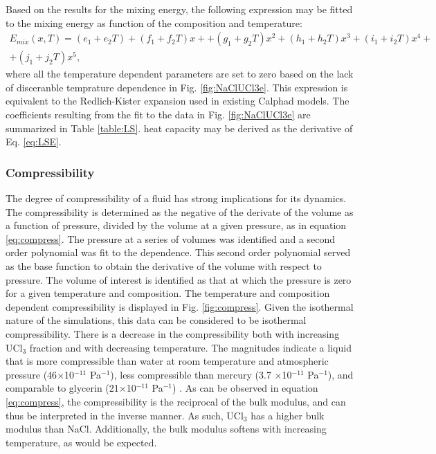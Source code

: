 \documentclass[preprint,3p,10pt,onecolumn,number,sort&compress]{elsarticle}
\begin{document}
Based on the results for the mixing energy, the following expression may be fitted to the mixing energy as function of the composition and temperature:
\begin{equation}
\begin{split}
E_{mix}(x,T)=(e_1+e_2T)+(f_1+f_2T)x++(g_1+g_2T)x^2+(h_1+h_2T)x^3+(i_1+i_2T)x^4+\\
+(j_1+j_2T)x^5,
\label{eq:LSE}
\end{split}
\end{equation}
where all the temperature dependent parameters are set to zero based on the lack of disceranble temprature dependence in Fig. \ref{fig:NaClUCl3e}. This expression is equivalent to the Redlich-Kister expansion used in existing Calphad models. The coefficients resulting from the fit to the data in Fig. \ref{fig:NaClUCl3e} are summarized in Table \ref{table:LS}. heat capacity may be derived as the derivative of Eq. \ref{eq:LSE}.

\subsubsection{Compressibility}

The degree of compressibility of a fluid has strong implications for its dynamics. The compressibility is determined as the negative of the derivate of the volume as a function of pressure, divided by the volume at a given pressure, as in equation \ref{eq:compress}. The pressure at a series of volumes was identified and a second order polynomial was fit to the dependence. This second order polynomial served as the base function to obtain the derivative of the volume with respect to pressure. The volume of interest is identified as that at which the pressure is zero for a given temperature and composition. The temperature and composition dependent compressibility is displayed in Fig. \ref{fig:compress}. Given the isothermal nature of the simulations, this data can be considered to be isothermal compressibility. There is a decrease in the compressibility both with increasing UCl$_3$ fraction and with decreasing temperature. The magnitudes indicate a liquid that is more compressible than water at room temperature and atmospheric pressure (46$\times$10$^{-11}$ Pa$^{-1}$), less compressible than mercury (3.7 $\times$10$^{-11}$ Pa$^{-1}$), and comparable to glycerin (21$\times$10$^{-11}$ Pa$^{-1}$) \cite{aiphandbook}. As can be observed in equation \ref{eq:compress}, the compressibility is the reciprocal of the bulk modulus, and can thus be interpreted in the inverse manner. As such, UCl$_3$ has a higher bulk modulus than NaCl. Additionally, the bulk modulus softens with increasing temperature, as would be expected.  
\end{document}
